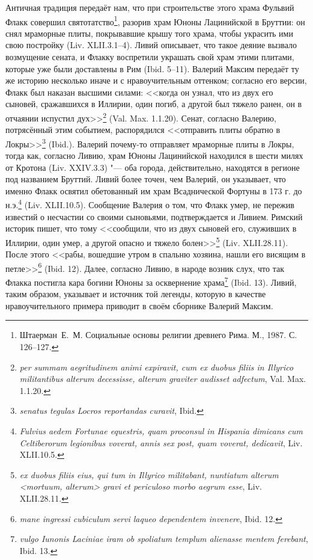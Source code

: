 Античная традиция передаёт нам, что при строительстве этого храма Фульвий Флакк совершил святотатство\footnote{Штаерман~Е.~М. Социальные основы религии древнего Рима. М., 1987. С. 126--127.}, разорив храм Юноны Лацинийской в Бруттии: он снял мраморные плиты, покрывавшие крышу того храма, чтобы украсить ими свою постройку (Liv. XLII.3.1--4). Ливий описывает, что такое деяние вызвало возмущение сената, и Флакку воспретили украшать свой храм этими плитами, которые уже были доставлены в Рим (Ibid. 5--11). Валерий Максим передаёт ту же историю несколько иначе и с нравоучительным оттенком; согласно его версии, Флакк был наказан высшими силами: <<когда он узнал, что из двух его сыновей, сражавшихся в Иллирии, один погиб, а другой был тяжело ранен, он в отчаянии испустил дух>>\footnote{\textit{per summam aegritudinem animi expiravit, cum ex duobus filiis in Illyrico militantibus alterum decessisse, alterum graviter audisset adfectum}, Val. Max. 1.1.20.} (Val. Max. 1.1.20). Сенат, согласно Валерию, потрясённый этим событием, распорядился <<отправить плиты обратно в Локры>>\footnote{\textit{senatus tegulas Locros reportandas curavit}, Ibid.} (Ibid.). Валерий почему-то отправляет мраморные плиты в Локры, тогда как, согласно Ливию, храм Юноны Лацинийской находился в шести милях от Кротона (Liv. XXIV.3.3) "--- оба города, действительно, находятся в регионе под названием Бруттий. Ливий более точен, чем Валерий, он указывает, что именно Флакк освятил обетованный им храм Всаднической Фортуны в 173 г. до н.э.\footnote{\textit{Fulvius aedem Fortunae equestris, quam proconsul in Hispania dimicans cum Celtiberorum legionibus voverat, annis sex post, quam voverat, dedicavit}, Liv. XLII.10.5.} (Liv. XLII.10.5). Сообщение Валерия о том, что Флакк умер, не пережив известий о несчастии со своими сыновьями, подтверждается и Ливием. Римский историк пишет, что тому <<сообщили, что из двух сыновей его, служивших в Иллирии, один умер, а другой опасно и тяжело болен>>\footnote{\textit{ex duobus filiis eius, qui tum in Illyrico militabant, nuntiatum alterum <mortuum, alterum> gravi et periculoso morbo aegrum esse}, Liv. XLII.28.11.} (Liv. XLII.28.11). После этого <<рабы, вошедшие утром в спальню хозяина, нашли его висящим в петле>>\footnote{\textit{mane ingressi cubiculum servi laqueo dependentem invenere}, Ibid. 12.} (Ibid. 12). Далее, согласно Ливию, в народе возник слух, что так Флакка постигла кара богини Юноны за осквернение храма\footnote{\textit{vulgo Iunonis Laciniae iram ob spoliatum templum alienasse mentem ferebant}, Ibid. 13.} (Ibid. 13). Ливий, таким образом, указывает и источник той легенды, которую в качестве нравоучительного примера приводит в своём сборнике Валерий Максим.

